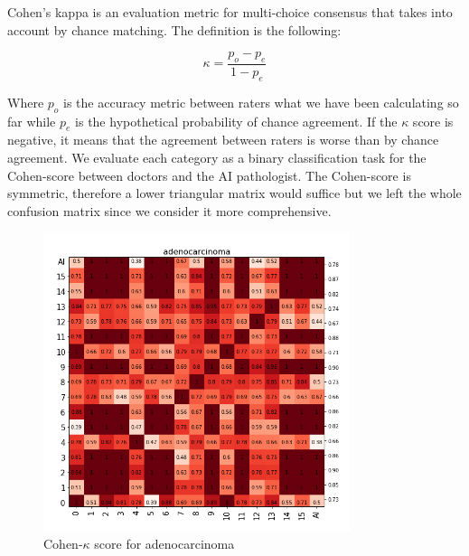 \documentclass[a4paper,12pt]{article}
\begin{document}
\vspace{4mm}

\par Cohen's kappa \cite{cohen1960coefficient} is an evaluation metric for multi-choice consensus that takes into account by chance matching. The definition is the following:

\vspace{4mm}

\begin{equation}
    \kappa = \frac{p_{o} - p_{e}}{1 - p_{e}}
    \label{eq:cohen-k}
\end{equation}

\vspace{4mm}

\par Where $p_{o}$ is the accuracy metric between raters what we have been calculating so far while $p_{e}$ is the hypothetical probability of chance agreement. If the $\kappa$ score is negative, it means that the agreement between raters is worse than by chance agreement. We evaluate each category as a binary classification task for the Cohen-score between doctors and the AI pathologist. The Cohen-score is symmetric, therefore a lower triangular matrix would suffice but we left the whole confusion matrix since we consider it more comprehensive.

\begin{figure}[H]
    \centering
    \includegraphics[width=0.8\textwidth]{results/kappa_adenocarcinoma.png}
    \caption{Cohen-$\kappa$ score for adenocarcinoma}
    \label{fig:kohen_adeno}
\end{figure}
\end{document}
